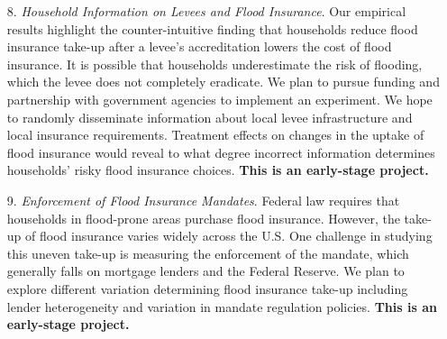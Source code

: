 \begin{enumerate}
\item[8.] \textit{Household Information on Levees and Flood Insurance}. Our empirical results highlight the counter-intuitive finding that households reduce flood insurance take-up after a levee’s accreditation lowers the cost of flood insurance. It is possible that households underestimate the risk of flooding, which the levee does not completely eradicate. We plan to pursue funding and partnership with government agencies to implement an experiment. We hope to randomly disseminate information about local levee infrastructure and local insurance requirements. Treatment effects on changes in the uptake of flood insurance would reveal to what degree incorrect information determines households’ risky flood insurance choices. \textbf{This is an early-stage project.}

\item[9.] \textit{Enforcement of Flood Insurance Mandates}. Federal law requires that households in flood-prone areas purchase flood insurance. However, the take-up of flood insurance varies widely across the U.S. One challenge in studying this uneven take-up is measuring the enforcement of the mandate, which generally falls on mortgage lenders and the Federal Reserve. We plan to explore different variation determining flood insurance take-up including lender heterogeneity and variation in mandate regulation policies. \textbf{This is an early-stage project.}
\end{enumerate}



